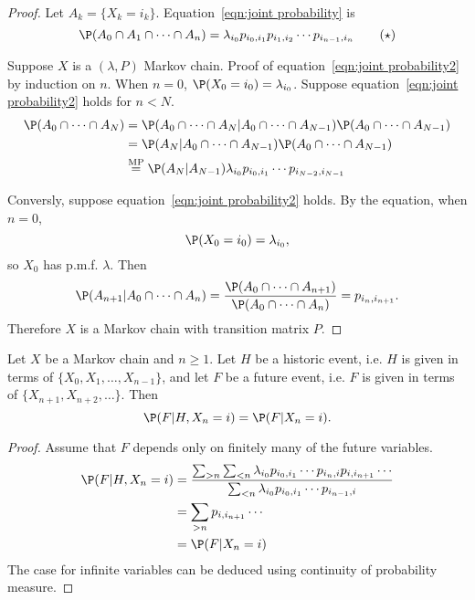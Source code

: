 \documentclass[a4paper]{article}
\begin{document}
\begin{proof}
  Let $A_k = \{X_k=i_k\}$. Equation~\eqref{eqn:joint probability} is
\begin{equation}
  \label{eqn:joint probability2}
  \P(A_0\cap A_1 \cap \cdots \cap A_n) = \lambda_{i_0} p_{i_0,i_1} p_{i_1,i_2} \cdots p_{i_{n-1}, i_n}
  \tag{$\star$}
\end{equation}

Suppose $X$ is a $(\lambda,P)$ Markov chain. Proof of equation~\eqref{eqn:joint probability2} by induction on $n$. When $n=0$, $\P(X_0=i_0)=\lambda_{i_0}$. Suppose equation~\eqref{eqn:joint probability2} holds for $n<N$.
\begin{align*}
  \P(A_0\cap\cdots\cap A_N) &= \P(A_0\cap\cdots \cap A_N|A_0\cap\cdots\cap A_{N-1}) \P(A_0\cap\cdots \cap A_{N-1}) \\
                            &= \P(A_N|A_0\cap\cdots\cap A_{N-1})\P(A_0\cap\cdots\cap A_{N-1}) \\
                            &\stackrel{\text{MP}}{=} \P(A_N|A_{N-1}) \lambda_{i_0} p_{i_0,i_1} \cdots p_{i_{N-2},i_{N-1}}
  \end{align*}

Conversly, suppose equation~\eqref{eqn:joint probability2} holds. By the equation, when $n=0$,
\[
  \P(X_0=i_0) = \lambda_{i_0},
\]
so $X_0$ has p.m.f. $\lambda$. Then
\[
  \P(A_{n+1}|A_0\cap\cdots\cap A_n) = \frac{\P(A_0\cap\cdots\cap A_{n+1})}{\P(A_0\cap\dots\cap A_n)} = p_{i_n,i_{n+1}}.
    \]
    Therefore $X$ is a Markov chain with transition matrix $P$.
\end{proof}

\begin{thm}
  Let $X$ be a Markov chain and $n\geq1$. Let $H$ be a historic event, i.e. $H$ is given in terms of $\{X_0,X_1,\ldots,X_{n-1}\}$, and let $F$ be a future event, i.e. $F$ is given in terms of $\{X_{n+1},X_{n+2},\ldots\}$. Then
  \[
    \P(F|H, X_n=i) = \P(F|X_n=i).
  \]
  
\end{thm}

\begin{proof}
  Assume that $F$ depends only on finitely many of the future variables.
  \begin{align*}
    \P(F|H,X_n=i) &= \frac{\sum_{>n}\sum_{<n}\lambda_{i_0}p_{i_0,i_1}\cdots p_{i_n,i}p_{i,i_{n+1}}\cdots}{\sum_{<n} \lambda_{i_0}p_{i_0,i_1}\cdots p_{i_{n-1},i}} \\
                  &= \sum_{>n} p_{i,i_{n+1}} \cdots \\
                  &= \P(F|X_n=i)
  \end{align*}
  The case for infinite variables can be deduced using continuity of probability measure.
\end{proof}
\end{document}
